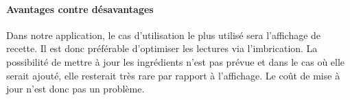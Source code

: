 		 \paragraph{Avantages contre désavantages} %
		 \label{par:avantages_contre_desavantages}
		 	Dans notre application, le cas d'utilisation le plus utilisé sera l'affichage de recette. Il est donc préférable d'optimiser les lectures via l'imbrication. La possibilité de mettre à jour les ingrédients n'est pas prévue et dans le cas où elle serait ajouté, elle resterait très rare par rapport à l'affichage. Le coût de mise à jour n'est donc pas un problème.

